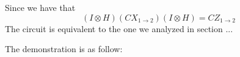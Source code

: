 \begin{figure}[h]
    \centering

\end{figure}

Since we have that
\begin{equation}
    (I \otimes H) (CX_{1 \to 2}) ( I \otimes H) = CZ_{1 \to 2}
\end{equation}
The circuit is equivalent to the one we analyzed in section ... 

The demonstration is as follow: